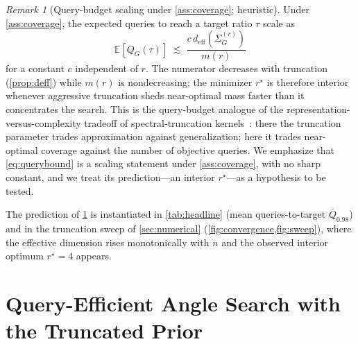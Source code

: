 \documentclass[aps,prresearch,reprint,amsmath,amssymb,floatfix,nofootinbib,superscriptaddress,longbibliography]{revtex4-2}
\theoremstyle{remark}
\newtheorem{remark}{Remark}
\begin{document}
\begin{remark}[Query-budget scaling under \cref{ass:coverage}; heuristic]
\label{rem:query}
Under \cref{ass:coverage}, the expected queries to reach a target ratio \(\tau\)
scale as
\begin{equation}
\mathbb{E}\!\left[Q_G(\tau)\right]\;\lesssim\;\frac{c\,d_{\mathrm{eff}}(\Sigma_G^{(r)})}{m(r)}
\label{eq:querybound}
\end{equation}
for a constant \(c\) independent of \(r\).  The numerator decreases with
truncation (\cref{prop:deff}) while \(m(r)\) is nondecreasing; the minimizer
\(r^{\star}\) is therefore interior whenever aggressive truncation sheds
near-optimal mass faster than it concentrates the search.  This is the
query-budget analogue of the representation-versus-complexity tradeoff of
spectral-truncation kernels~\cite{hashimoto2024spectral}: there the truncation
parameter trades approximation against generalization; here it trades near-optimal
coverage against the number of objective queries.  We emphasize that
\cref{eq:querybound} is a scaling statement under \cref{ass:coverage}, with no
sharp constant, and we treat its prediction---an interior \(r^{\star}\)---as a
hypothesis to be tested.
\end{remark}

The prediction of \cref{rem:query} is instantiated in \cref{tab:headline} (mean
queries-to-target \(\bar Q_{0.98}\)) and in the truncation sweep of
\cref{sec:numerical} (\cref{fig:convergence,fig:sweep}), where the effective
dimension rises monotonically with \(n\) and the observed interior optimum
\(r^{\star}{=}4\) appears.

\section{Query-Efficient Angle Search with the Truncated Prior}
\label{sec:search}
\end{document}
